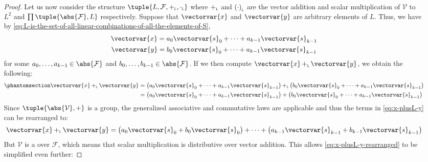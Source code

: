 \begin{proof}
    \vspace{0.3cm}
    \noindent
    Let us now consider the structure \( \tuple{L, \mathcal{F}, \smallsubscript{+}{L}, \smallsubscript{\cdot}{L}} \) where \( \smallsubscript{+}{L} \)
    and \( \smallsubscript{(\cdot)}{L} \) are the vector addition and scalar multiplication of \( \mathcal{V} \)
     to \( L^{2} \) and \( \prod \tuple{\abs{\mathcal{F}}, L} \) respectively.
    Suppose that \( \vectorvar{x} \) and \( \vectorvar{y} \) are arbitrary elements of \( L \).
    Thus, we have by \eqref{eq:L-is-the-set-of-all-linear-combinations-of-all-the-elements-of-S},
    \begin{gather*}
            \vectorvar{x} = a_{0}\vectorvar{s}_{0} + \cdots + a_{k-1}\vectorvar{s}_{k-1}\\
            \vectorvar{y} = b_{0}\vectorvar{s}_{0} + \cdots + a_{k-1}\vectorvar{s}_{k-1}
    \end{gather*}
    for some \( a_{0}, \dots, a_{k-1} \in \abs{\mathcal{F}} \) and \( b_{0}, \dots, b_{k-1} \in \abs{\mathcal{F}} \).
    If we then compute \( \vectorvar{x} \, \smallsubscript{+}{L} \, \vectorvar{y} \), we obtain the following:
    \begin{align}
        \phantomsection \label{eq:x-plusL-y}
        \vectorvar{x} \, \smallsubscript{+}{L} \, \vectorvar{y}
        &= \big( a_{0}\vectorvar{s}_{0} + \cdots + a_{k-1}\vectorvar{s}_{k-1} \big) \, \smallsubscript{+}{L} \,
          \big( b_{0}\vectorvar{s}_{0} + \cdots + a_{k-1}\vectorvar{s}_{k-1} \big) \notag \\
        &= \big( a_{0}\vectorvar{s}_{0} + \cdots + a_{k-1}\vectorvar{s}_{k-1} \big) +
          \big( b_{0}\vectorvar{s}_{0} + \cdots + a_{k-1}\vectorvar{s}_{k-1} \big)
    \end{align}
    Since \( \tuple{\abs{\mathcal{V}}, +} \) is a group, the generalized associative and commutative laws are applicable
    and thus the terms in \eqref{eq:x-plusL-y} can be rearranged to:
    \begin{align}
        \label{eq:x-plusL-y-rearranged}
        \vectorvar{x} \, \smallsubscript{+}{L} \, \vectorvar{y}
         = \big( a_{0}\vectorvar{s}_{0} + b_{0}\vectorvar{s}_{0} \big) + \cdots + \big( a_{k-1}\vectorvar{s}_{k-1} + b_{k-1}\vectorvar{s}_{k-1} \big)
    \end{align}
    But \( \mathcal{V} \) is a  over \( \mathcal{F} \), which means that scalar multiplication is distributive
    over vector addition. This allows \eqref{eq:x-plusL-y-rearranged} to be simplified even further:

\end{proof}
